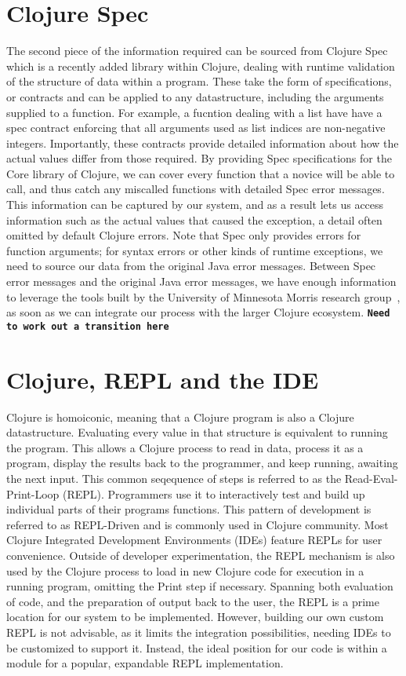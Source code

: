 \documentclass[12pt]{article}
\newcommand{\comment}[1]{{\bf \tt  {#1}}}
\begin{document}
\section{Clojure Spec}
The second piece of the information required can be sourced from Clojure Spec~\cite{spec}
which is a recently added library within Clojure, dealing with runtime validation of
the structure of data within a program. These take the form of specifications, or contracts
and can be applied to any datastructure, including the arguments supplied to a function.
 For example, a fucntion dealing with a list have have a spec contract enforcing that all arguments
 used as list indices are non-negative integers.
Importantly, these contracts provide detailed information
 about how the actual values differ from those required.
By providing Spec specifications for the Core library of Clojure,
 we can cover every function that a novice will be able to call, and thus catch
 any miscalled functions with detailed Spec error messages.
 This information can be captured by our system, and as a result
 lets us access information such as the actual values that caused the exception,
 a detail often omitted by default Clojure errors.
Note that Spec only provides errors for function arguments; for syntax errors or other kinds of
runtime exceptions, we need to source our data from the original Java error messages.
Between Spec error messages and the original Java error messages, we have enough
information to leverage the tools built by the
 University of Minnesota Morris research group~\cite{mics2017}, as soon as we can integrate
 our process with the larger Clojure ecosystem.
 \comment{Need to work out a transition here}

\section{Clojure, REPL and the IDE}
Clojure is homoiconic, meaning that a Clojure program is also a Clojure datastructure.
 Evaluating every value in that structure is
equivalent to running the program.
This allows a Clojure process to read in data, process it as a program, display the results
 back to the programmer, and keep running, awaiting the next input.
 This common seqequence of steps is referred to
as the Read-Eval-Print-Loop (REPL). Programmers use it to interactively test and build up
individual parts of their programs functions. This pattern of development is
referred to as REPL-Driven and is commonly used in Clojure community.
 Most Clojure Integrated Development Environments (IDEs) feature REPLs for
 user convenience. Outside of developer experimentation, the REPL mechanism is also used
by the Clojure process to load in new Clojure code for execution in a running program,
omitting the Print step if necessary.
Spanning both evaluation of code, and the preparation of output back to the user,
the REPL is a prime location for our system to be implemented.
However, building our own custom REPL is not advisable, as it limits the
integration possibilities, needing IDEs to be customized to support it.
Instead, the ideal position for our code is within a module
 for a popular, expandable REPL implementation.
\end{document}
